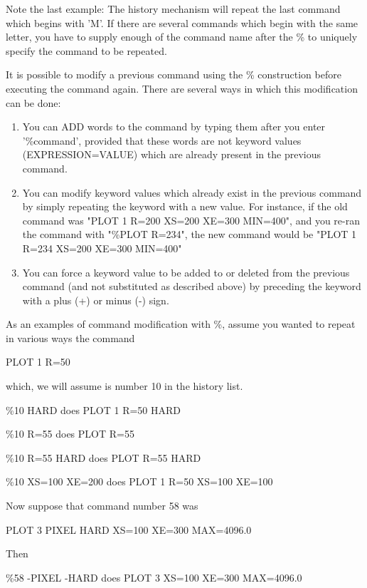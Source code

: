 Note the last example: The history mechanism will repeat the last command
which begins with 'M'.  If there are several commands which begin with the
same letter, you have to supply enough of the command name after the \% to
uniquely specify the command to be repeated.

It is possible to modify a previous command using the \% construction
before executing the command again. There are several ways in which this
modification can be done:

\begin{enumerate}
  \item{You can ADD words to the command by typing them after you enter
       '\%command', provided that these words are not keyword values
       (EXPRESSION=VALUE) which are already present in the previous
       command.}

  \item{You can modify keyword values which already exist in the previous
       command by simply repeating the keyword with a new value.  For
       instance, if the old command was "PLOT 1 R=200 XS=200 XE=300
       MIN=400", and you re-ran the command with "\%PLOT R=234", the new
       command would be "PLOT 1 R=234 XS=200 XE=300 MIN=400"}

  \item{You can force a keyword value to be added to or deleted from the
       previous command (and not substituted as described above) by
       preceding the keyword with a plus (+) or minus (-) sign.}
\end{enumerate}

As an examples of command modification with \%, assume you wanted to repeat
in various ways the command
\begin{hanging}
  \item{PLOT 1 R=50}
\end{hanging}
which, we will assume is number 10 in the history list.
\begin{example}
  \item[\%10 HARD\hfill]{does PLOT 1 R=50 HARD}
  \item[\%10 R=55\hfill]{does PLOT R=55}
  \item[\%10 R=55 HARD\hfill]{does PLOT R=55 HARD}
  \item[\%10 XS=100 XE=200\hfill]{does PLOT 1 R=50 XS=100 XE=100}
\end{example}
Now suppose that command number 58 was
\begin{hanging}
  \item{PLOT 3 PIXEL HARD XS=100 XE=300 MAX=4096.0}
\end{hanging}
Then
\begin{example}
  \item[\%58 -PIXEL -HARD\hfill]{does PLOT 3 XS=100 XE=300 MAX=4096.0}
\end{example}

